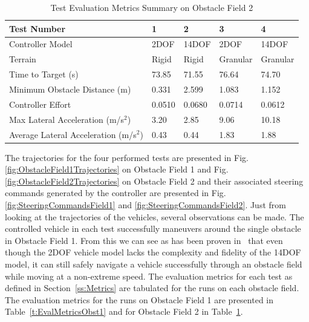\documentclass[12pt,twocolumn]{article}
\begin{document}
\begin{table}
		\centering
\begin{tabular}{ ||p{5cm}|p{2cm}|p{2cm}|p{2cm}|p{2cm}||  }
		\hline
		Test Number & 1 & 2 & 3 & 4\\
		\hline
		Controller Model & 2DOF & 14DOF & 2DOF & 14DOF\\
		\hline
		Terrain & Rigid & Rigid & Granular & Granular\\
		\hline
		Time to Target (s)  & 73.85 & 71.55 & 76.64 & 74.70\\ 
		\hline
		Minimum Obstacle Distance (m) & 0.331 & 2.599 & 1.083 & 1.152\\
		\hline
		Controller Effort & 0.0510 & 0.0680 & 0.0714 & 0.0612\\
		\hline
		Max Lateral Acceleration (m/s$^{2}$)& 3.20 & 2.85 &9.06 & 10.18 \\
		\hline
		Average Lateral Acceleration (m/s$^{2}$) & 0.43 & 0.44 & 1.83 & 1.88\\
		\hline
\end{tabular}
\caption{Test Evaluation Metrics Summary on Obstacle Field 2}
\label{t:EvalMetricsObst2}
\end{table}

The trajectories for the four performed tests are presented in Fig. \ref{fig:ObstacleField1Trajectories} on Obstacle Field 1 and Fig. \ref{fig:ObstacleField2Trajectories}  on Obstacle Field 2 and their associated steering commands generated by the controller are presented in Fig. \ref{fig:SteeringCommandsField1} and \ref{fig:SteeringCommandsField2}. Just from looking at the trajectories of the vehicles, several observations can be made. The controlled vehicle in each test successfully maneuvers around the single obstacle in Obstacle Field 1. From this we can see as has been proven in~\cite{ModelFidelity2016} that even though the 2DOF vehicle model lacks the complexity and fidelity of the 14DOF model, it can still safely navigate a vehicle successfully through an obstacle field while moving at a non-extreme speed. The evaluation metrics for each test as defined in Section~\ref{ss:Metrics} are tabulated for the runs on each obstacle field. The evaluation metrics for the runs on Obstacle Field 1 are presented in Table~\ref{t:EvalMetricsObst1} and for Obstacle Field 2 in Table~\ref{t:EvalMetricsObst2}. 
\end{document}
